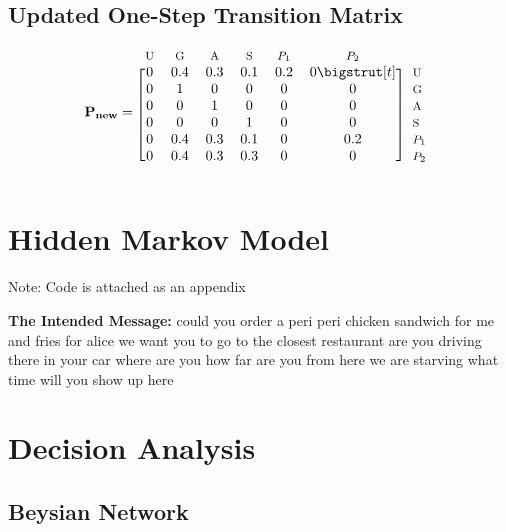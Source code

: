 \documentclass[12pt]{article}
\begin{document}
\subsection{Updated One-Step Transition Matrix}
\begin{equation*}
	\mathbf{P_{new}}=
	\begin{blockarray}{*{6}{c} l}
	  \begin{block}{*{6}{>{$\footnotesize}c<{$}} l}
		U & G & A & S & $P_1$ & $P_2$ & \\
	  \end{block}
	  \begin{block}{[*{6}{c}]>{$\footnotesize}l<{$}}
		0 & 0.4 & 0.3 & 0.1& 0.2 & 0\bigstrut[t]& U \\
		0 & 1 & 0 & 0 & 0 & 0 & G \\
		0 & 0 & 1 & 0 & 0 & 0 & A \\
		0 & 0 & 0 & 1 & 0 & 0 & S \\
		0 & 0.4 & 0.3 & 0.1 & 0 & 0.2 & $P_1$ \\
		0 & 0.4 & 0.3 & 0.3 & 0 & 0 & $P_2$ \\
	  \end{block}
	\end{blockarray}
\end{equation*}

\section{Hidden Markov Model}

Note: Code is attached as an appendix\newline

\textbf{The Intended Message:}\newline
could you order a peri peri chicken sandwich for me and fries for alice\newline
we want you to go to the closest restaurant\newline
are you driving there in your car\newline
where are you\newline
how far are you from here\newline
we are starving\newline
what time will you show up here\newline

\section{Decision Analysis}
\subsection{Beysian Network}

\end{document}
